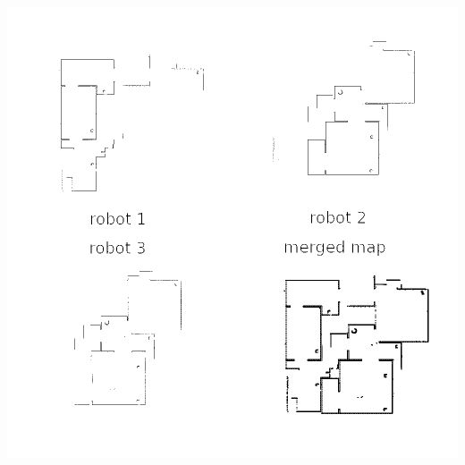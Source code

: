 \documentclass[17pt, a0paper, portrait]{tikzposter}
\begin{document}
\begin{columns}
{\begin{minipage}[t]{0.47\linewidth}
\begin{tikzfigure}
        \includegraphics[width=\linewidth]{../img/merging-with-known-initial-positions-end.png}
        \label{fig:merging-with-known-initial-positions-end}
    \end{tikzfigure}
\end{minipage}
} %


\end{columns}
\end{document}
